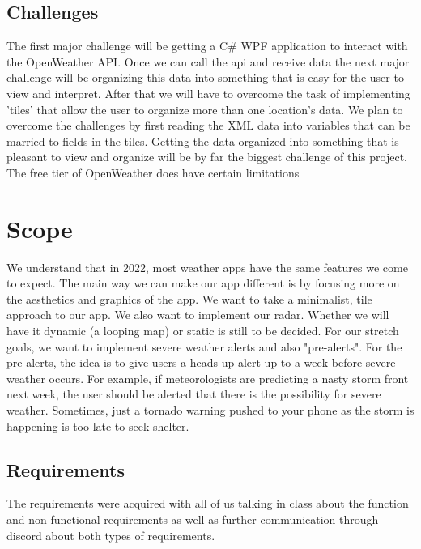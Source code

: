 \documentclass[10pt,conference,onecolumn,compsoc]{IEEEtran}
\begin{document}
\subsection{Challenges}
	The first major challenge will be getting a C\# WPF application to interact with the OpenWeather API. Once we can call the api and receive data the next major challenge will be organizing this data into something that is easy for the user to view and interpret. After that we will have to overcome the task of implementing 'tiles' that allow the user to organize more than one location's data. We plan to overcome the challenges by first reading the XML data into variables that can be married to fields in the tiles. Getting the data organized into something that is pleasant to view and organize will be by far the biggest challenge of this project. The free tier of OpenWeather does have certain limitations


\section{Scope}
	We understand that in 2022, most weather apps have the same features we come to expect. The main way we can make our app different is by focusing more on the aesthetics and graphics of the app. We want to take a minimalist, tile approach to our app. We also want to implement our radar. Whether we will have it dynamic (a looping map) or static is still to be decided. For our stretch goals, we want to implement severe weather alerts and also "pre-alerts". For the pre-alerts, the idea is to give users a heads-up alert up to a week before severe weather occurs. For example, if meteorologists are predicting a nasty storm front next week, the user should be alerted that there is the possibility for severe weather. Sometimes, just a tornado warning pushed to your phone as the storm is happening is too late to seek shelter.


\subsection{Requirements}
The requirements were acquired with all of us talking in class about the function and non-functional requirements as well as further communication through discord about both types of requirements.
\end{document}
